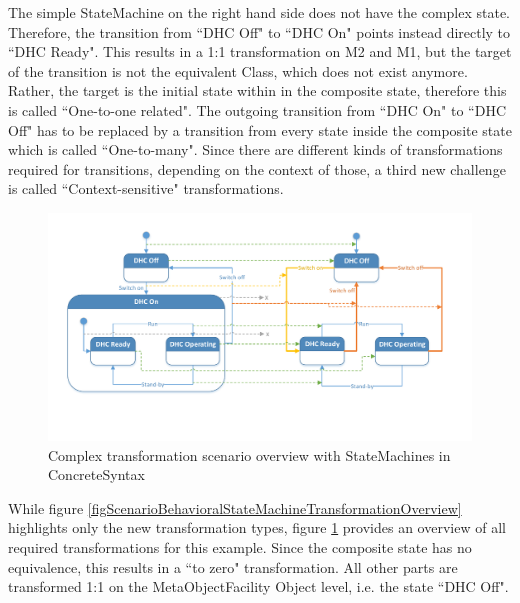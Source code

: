 The simple \gls{StateMachine} on the right hand side does not have the complex state. Therefore, the transition from ``DHC Off" to ``DHC On" points instead directly to ``DHC Ready". This results in a 1:1 transformation on M2 and M1, but the target of the transition is not the equivalent \gls{Class}, which does not exist anymore. Rather, the target is the initial state within in the composite state, therefore this is called ``One-to-one related". The outgoing transition from ``DHC On" to ``DHC Off" has to be replaced by a transition from every state inside the composite state which is called ``One-to-many". Since there are different kinds of transformations required for transitions, depending on the context of those, a third new challenge is called ``Context-sensitive" transformations.

\begin{figure}[htb]
	\centering
	\includegraphics[scale=0.6, trim=0cm 1cm 0cm 1cm, clip=true]{Images/ScenarioBehavioralStateMachineTransformationOverview2.pdf} 
	\caption{Complex transformation scenario overview with \glspl{StateMachine} in \gls{ConcreteSyntax}}
	\label{figScenarioBehavioralStateMachineTransformationOverview2}
\end{figure}

While figure \ref{figScenarioBehavioralStateMachineTransformationOverview} highlights only the new transformation types, figure \ref{figScenarioBehavioralStateMachineTransformationOverview2} provides an overview of all required transformations for this example. Since the composite state has no equivalence, this results in a ``to zero" transformation. All other parts are transformed 1:1 on the \gls{MetaObjectFacility} \gls{Object} level, i.e. the state ``DHC Off". 

